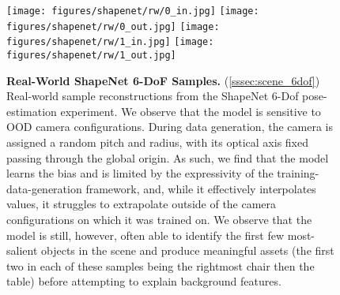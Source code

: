 \begin{figure}[t!]
\centering
\texttt{[image: figures/shapenet/rw/0\_in.jpg]}\hfill
\texttt{[image: figures/shapenet/rw/0\_out.jpg]}\hfill
\texttt{[image: figures/shapenet/rw/1\_in.jpg]}\hfill
\texttt{[image: figures/shapenet/rw/1\_out.jpg]}
\caption{\textbf{Real-World ShapeNet 6-DoF Samples.} (\cref{sssec:scene_6dof}) 
Real-world sample reconstructions from the ShapeNet 6-Dof pose-estimation experiment.
We observe that the model is sensitive to OOD camera configurations.
During data generation, the camera is assigned a random pitch and radius, with its optical axis fixed passing through the global origin.
As such, we find that the model learns the bias and is limited by the expressivity of the training-data-generation framework, and, while it effectively interpolates values, it struggles to extrapolate outside of the camera configurations on which it was trained on.
We observe that the model is still, however, often able to identify the first few most-salient objects in the scene and produce meaningful assets (the first two in each of these samples being the rightmost chair then the table) before attempting to explain background features.
}
\label{fig:scene_6dof_rw_samples}
\end{figure}